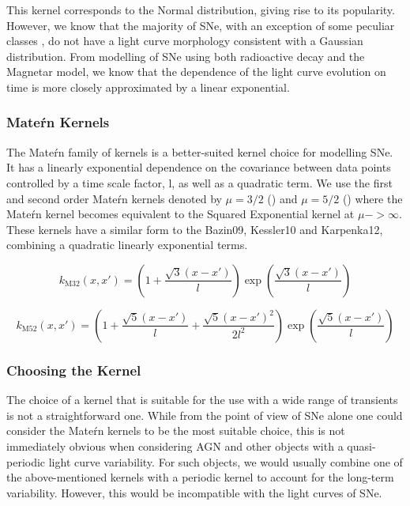 This kernel corresponds to the Normal distribution, giving rise to its popularity. However, we know that the majority of SNe, with an exception of some peculiar classes \citep{Pursiainen2018}, do not have a light curve morphology consistent with a Gaussian distribution. From modelling of SNe using both radioactive decay and the Magnetar model, we know that the dependence of the light curve evolution on time is more closely approximated by a linear exponential.

\subsubsection{Mate\'rn Kernels}
The Mate\'rn family of kernels is a better-suited kernel choice for modelling SNe. It has a linearly exponential dependence on the covariance between data points controlled by a time scale factor, l, as well as a quadratic term. We use the first and second order Mate\'rn kernels denoted by $\mu = 3/2$ () and $\mu = 5/2$ () where the Mate\'rn kernel becomes equivalent to the Squared Exponential kernel at $\mu -> \infty$. These kernels have a similar form to the Bazin09, Kessler10 and Karpenka12, combining a quadratic linearly exponential terms.

\begin{equation} \label{eq:M32}
  k_{\textrm{M32}}(x,x') = \left(1 + \frac{\sqrt{3}(x - x')}{l}\right) \exp \left( \frac{\sqrt{3}(x - x')}{l} \right)
\end{equation}

\begin{equation} \label{eq:M52}
  k_{\textrm{M52}}(x,x') = \left(1 + \frac{\sqrt{5}(x - x')}{l} + \frac{\sqrt{5}(x - x')^2}{2l^2}\right) \exp \left( \frac{\sqrt{5}(x - x')}{l} \right)
\end{equation}

\subsubsection{Choosing the Kernel}
The choice of a kernel that is suitable for the use with a wide range of transients is not a straightforward one. While from the point of view of SNe alone one could consider the Mate\'rn kernels to be the most suitable choice, this is not immediately obvious when considering AGN and other objects with a quasi-periodic light curve variability. For such objects, we would usually combine one of the above-mentioned kernels with a periodic kernel to account for the long-term variability. However, this would be incompatible with the light curves of SNe.

